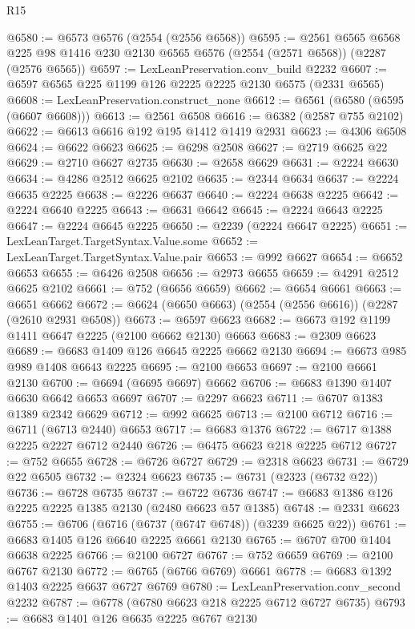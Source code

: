\begin{lexlean}{R15}
\begin{coremodule}
@6580 := @6573 @6576 (@2554 (@2556 @6568))
@6595 := @2561
    @6565
    @6568
    @225
    @98
    @1416
    @230
    @2130
    @6565
    @6576
    (@2554 (@2571 @6568))
    (@2287 (@2576 @6565))
@6597 := LexLeanPreservation.conv_build @2232
@6607 := @6597 @6565 @225 @1199 @126 @2225 @2225 @2130 @6575 (@2331 @6565)
@6608 := LexLeanPreservation.construct_none
@6612 := @6561 (@6580 (@6595 (@6607 @6608)))
@6613 := @2561 @6508
@6616 := @6382 (@2587 @755 @2102)
@6622 := @6613 @6616 @192 @195 @1412 @1419 @2931
@6623 := @4306 @6508
@6624 := @6622 @6623
@6625 := @6298 @2508
@6627 := @2719 @6625 @22
@6629 := @2710 @6627 @2735
@6630 := @2658 @6629
@6631 := @2224 @6630
@6634 := @4286 @2512 @6625 @2102
@6635 := @2344 @6634
@6637 := @2224 @6635 @2225
@6638 := @2226 @6637
@6640 := @2224 @6638 @2225
@6642 := @2224 @6640 @2225
@6643 := @6631 @6642
@6645 := @2224 @6643 @2225
@6647 := @2224 @6645 @2225
@6650 := @2239 (@2224 @6647 @2225)
@6651 := LexLeanTarget.TargetSyntax.Value.some
@6652 := LexLeanTarget.TargetSyntax.Value.pair
@6653 := @992 @6627
@6654 := @6652 @6653
@6655 := @6426 @2508
@6656 := @2973 @6655
@6659 := @4291 @2512 @6625 @2102
@6661 := @752 (@6656 @6659)
@6662 := @6654 @6661
@6663 := @6651 @6662
@6672 := @6624 (@6650 @6663) (@2554 (@2556 @6616)) (@2287 (@2610 @2931 @6508))
@6673 := @6597 @6623
@6682 := @6673 @192 @1199 @1411 @6647 @2225 (@2100 @6662 @2130) @6663
@6683 := @2309 @6623
@6689 := @6683 @1409 @126 @6645 @2225 @6662 @2130
@6694 := @6673 @985 @989 @1408 @6643 @2225
@6695 := @2100 @6653
@6697 := @2100 @6661 @2130
@6700 := @6694 (@6695 @6697) @6662
@6706 := @6683 @1390 @1407 @6630 @6642 @6653 @6697
@6707 := @2297 @6623
@6711 := @6707 @1383 @1389 @2342 @6629
@6712 := @992 @6625
@6713 := @2100 @6712
@6716 := @6711 (@6713 @2440) @6653
@6717 := @6683 @1376
@6722 := @6717 @1388 @2225 @2227 @6712 @2440
@6726 := @6475 @6623 @218 @2225 @6712
@6727 := @752 @6655
@6728 := @6726 @6727
@6729 := @2318 @6623
@6731 := @6729 @22 @6505
@6732 := @2324 @6623
@6735 := @6731 (@2323 (@6732 @22))
@6736 := @6728 @6735
@6737 := @6722 @6736
@6747 := @6683 @1386 @126 @2225 @2225 @1385 @2130 (@2480 @6623 @57 @1385)
@6748 := @2331 @6623
@6755 := @6706 (@6716 (@6737 (@6747 @6748)) (@3239 @6625 @22))
@6761 := @6683 @1405 @126 @6640 @2225 @6661 @2130
@6765 := @6707 @700 @1404 @6638 @2225
@6766 := @2100 @6727
@6767 := @752 @6659
@6769 := @2100 @6767 @2130
@6772 := @6765 (@6766 @6769) @6661
@6778 := @6683 @1392 @1403 @2225 @6637 @6727 @6769
@6780 := LexLeanPreservation.conv_second @2232
@6787 := @6778 (@6780 @6623 @218 @2225 @6712 @6727 @6735)
@6793 := @6683 @1401 @126 @6635 @2225 @6767 @2130

\end{coremodule}
\end{lexlean}
